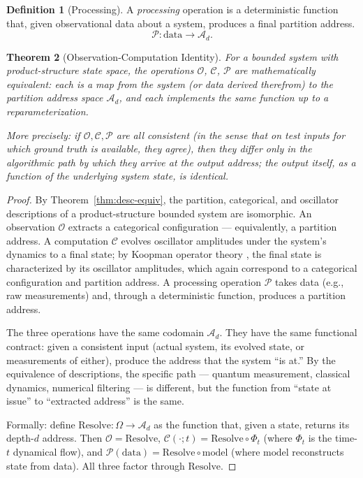 \documentclass[11pt,twocolumn,a4paper]{article}
\newtheorem{theorem}{Theorem}[section]
\theoremstyle{definition}
\newtheorem{definition}[theorem]{Definition}
\theoremstyle{remark}
\newcommand{\Oc}{\mathcal{O}}
\newcommand{\Cc}{\mathcal{C}}
\newcommand{\Pc}{\mathcal{P}}
\newcommand{\Ac}{\mathcal{A}}
\begin{document}
\begin{definition}[Processing]
\label{def:proc}
A \emph{processing} operation is a deterministic function that, given observational data about a system, produces a final partition address.
\[
\Pc: \text{data} \to \Ac_d.
\]
\end{definition}

\begin{theorem}[Observation-Computation Identity]
\label{thm:oci}
For a bounded system with product-structure state space, the operations $\Oc$, $\Cc$, $\Pc$ are mathematically equivalent: each is a map from the system (or data derived therefrom) to the partition address space $\Ac_d$, and each implements the same function up to a reparameterization.

More precisely: if $\Oc, \Cc, \Pc$ are all consistent (in the sense that on test inputs for which ground truth is available, they agree), then they differ only in the algorithmic path by which they arrive at the output address; the output itself, as a function of the underlying system state, is identical.
\end{theorem}

\begin{proof}
By Theorem~\ref{thm:desc-equiv}, the partition, categorical, and oscillator descriptions of a product-structure bounded system are isomorphic. An observation $\Oc$ extracts a categorical configuration --- equivalently, a partition address. A computation $\Cc$ evolves oscillator amplitudes under the system's dynamics to a final state; by Koopman operator theory \citep{koopman1931hamiltonian, mezic2005spectral}, the final state is characterized by its oscillator amplitudes, which again correspond to a categorical configuration and partition address. A processing operation $\Pc$ takes data (e.g., raw measurements) and, through a deterministic function, produces a partition address.

The three operations have the same codomain $\Ac_d$. They have the same functional contract: given a consistent input (actual system, its evolved state, or measurements of either), produce the address that the system ``is at.'' By the equivalence of descriptions, the specific path --- quantum measurement, classical dynamics, numerical filtering --- is different, but the function from ``state at issue'' to ``extracted address'' is the same.

Formally: define $\mathrm{Resolve}: \Omega \to \Ac_d$ as the function that, given a state, returns its depth-$d$ address. Then $\Oc = \mathrm{Resolve}$, $\Cc(\cdot; t) = \mathrm{Resolve} \circ \Phi_t$ (where $\Phi_t$ is the time-$t$ dynamical flow), and $\Pc(\mathrm{data}) = \mathrm{Resolve} \circ \mathrm{model}$ (where $\mathrm{model}$ reconstructs state from data). All three factor through $\mathrm{Resolve}$.
\end{proof}
\end{document}
